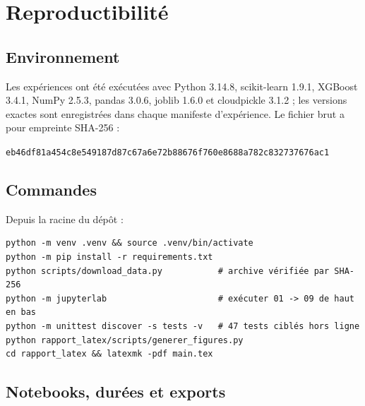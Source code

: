 \section{Reproductibilité}
\label{annexe:reproductibilite}

\subsection{Environnement}

Les expériences ont été exécutées avec Python 3.14.8, scikit-learn 1.9.1,
XGBoost 3.4.1, NumPy 2.5.3, pandas 3.0.6, joblib 1.6.0 et cloudpickle 3.1.2 ; les versions
exactes sont enregistrées dans chaque manifeste d'expérience. Le fichier brut
 a pour empreinte SHA-256 :

\begin{center}
\footnotesize\texttt{eb46df81a454c8e549187d87c67a6e72b88676f760e8688a782c832737676ac1}
\end{center}

\subsection{Commandes}

Depuis la racine du dépôt :
\begin{verbatim}
python -m venv .venv && source .venv/bin/activate
python -m pip install -r requirements.txt
python scripts/download_data.py           # archive vérifiée par SHA-256
python -m jupyterlab                      # exécuter 01 -> 09 de haut en bas
python -m unittest discover -s tests -v   # 47 tests ciblés hors ligne
python rapport_latex/scripts/generer_figures.py
cd rapport_latex && latexmk -pdf main.tex
\end{verbatim}

\subsection{Notebooks, durées et exports}

